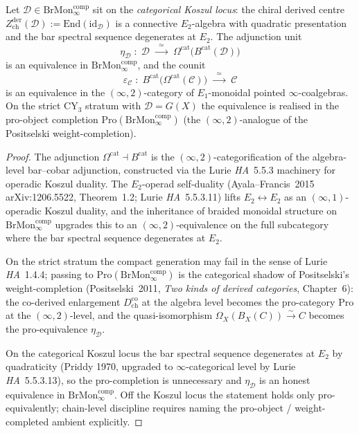 \begin{theorem}
\label{thm:cy-c-cat-thm-B}
Let $\mathcal D \in \mathrm{BrMon}^{\mathrm{comp}}_\infty$ sit on the
\emph{categorical Koszul locus}: the chiral derived centre
$Z^{\mathrm{der}}_{\mathrm{ch}}(\mathcal D) := \mathrm{End}(\mathrm{id}_{\mathcal D})$
is a connective $E_2$-algebra with quadratic presentation and the bar
spectral sequence degenerates at $E_2$. The adjunction unit
\[
 \eta_{\mathcal D} \;:\; \mathcal D
 \;\xrightarrow{\;\;\simeq\;\;}\;
 \Omega^{\mathrm{cat}} \!\bigl( B^{\mathrm{cat}}(\mathcal D) \bigr)
\]
is an equivalence in $\mathrm{BrMon}^{\mathrm{comp}}_\infty$, and the counit
\[
 \varepsilon_{\mathcal C} \;:\;
 B^{\mathrm{cat}} \!\bigl( \Omega^{\mathrm{cat}}(\mathcal C) \bigr)
 \;\xrightarrow{\;\;\simeq\;\;}\;
 \mathcal C
\]
is an equivalence in the $(\infty,2)$-category of $E_1$-monoidal pointed
$\infty$-coalgebras. On the strict CY$_3$ stratum with
$\mathcal D = G(X)$ the equivalence is realised in the pro-object
completion $\mathrm{Pro}(\mathrm{BrMon}^{\mathrm{comp}}_\infty)$
(the $(\infty,2)$-analogue of the Positselski weight-completion).
\end{theorem}

\begin{proof}
The adjunction $\Omega^{\mathrm{cat}} \dashv B^{\mathrm{cat}}$ is the
$(\infty,2)$-categorification of the algebra-level bar--cobar adjunction,
constructed via the Lurie \emph{HA}~5.5.3 machinery for operadic Koszul
duality. The $E_2$-operad self-duality (Ayala--Francis~2015
arXiv:1206.5522, Theorem~1.2; Lurie \emph{HA}~5.5.3.11) lifts
$E_2 \leftrightarrow E_2$ as an $(\infty,1)$-operadic Koszul duality, and
the inheritance of braided monoidal structure on
$\mathrm{BrMon}^{\mathrm{comp}}_\infty$ upgrades this to an
$(\infty,2)$-equivalence on the full subcategory where the bar spectral
sequence degenerates at $E_2$.

On the strict stratum the compact generation may fail in the sense of
Lurie \emph{HA}~1.4.4; passing to
$\mathrm{Pro}(\mathrm{BrMon}^{\mathrm{comp}}_\infty)$ is the categorical
shadow of Positselski's weight-completion
(Positselski~2011, \emph{Two kinds of derived categories}, Chapter~6):
the co-derived enlargement $D^{\mathrm{co}}_{\mathrm{ch}}$ at the
algebra level becomes the pro-category $\mathrm{Pro}$ at the
$(\infty,2)$-level, and the quasi-isomorphism
$\Omega_X(B_X(C)) \xrightarrow{\sim} C$ becomes the pro-equivalence
$\eta_{\mathcal D}$.

On the categorical Koszul locus the bar spectral sequence degenerates at
$E_2$ by quadraticity (Priddy 1970, upgraded to $\infty$-categorical
level by Lurie \emph{HA}~5.5.3.13), so the pro-completion is unnecessary
and $\eta_{\mathcal D}$ is an honest equivalence in
$\mathrm{BrMon}^{\mathrm{comp}}_\infty$. Off the Koszul locus the
statement holds only pro-equivalently; chain-level discipline requires naming the pro-object /
weight-completed ambient explicitly.
\end{proof}


